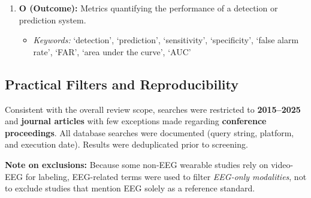 \begin{enumerate}
    \item \textbf{O (Outcome):} Metrics quantifying the performance of a detection or prediction system.
    \begin{itemize}
        \item \textit{Keywords:} `detection', `prediction', `sensitivity', `specificity', `false alarm rate', `FAR', `area under the curve', `AUC'
    \end{itemize}

\end{enumerate}


\subsection{Practical Filters and Reproducibility}
Consistent with the overall review scope, searches were restricted to
\textbf{2015--2025} and \textbf{journal articles} with few exceptions 
made regarding \textbf{conference proceedings}.
All database searches were documented (query string, platform, and
execution date). Results were deduplicated prior to screening.

\noindent\textbf{Note on exclusions:}
Because some non-EEG wearable studies rely on video-EEG for labeling,
EEG-related terms were used to filter \emph{EEG-only modalities}, not to
exclude studies that mention EEG solely as a reference standard.
